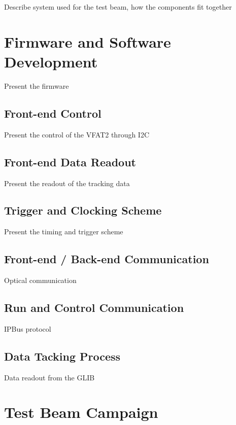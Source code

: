         Describe system used for the test beam, how the components fit together

    \section{Firmware and Software Development}

        Present the firmware

        \subsection{Front-end Control}

            Present the control of the VFAT2 through I2C

        \subsection{Front-end Data Readout}

            Present the readout of the tracking data

        \subsection{Trigger and Clocking Scheme}

            Present the timing and trigger scheme

        \subsection{Front-end / Back-end Communication}

            Optical communication

        \subsection{Run and Control Communication}

            IPBus protocol

        \subsection{Data Tacking Process}

            Data readout from the GLIB

    \section{Test Beam Campaign}

